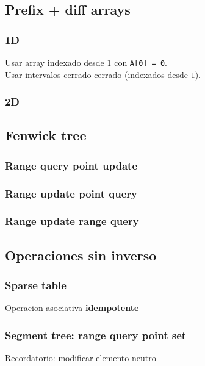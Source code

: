 \subsection{Prefix + diff arrays}
    \subsubsection{1D}
        Usar array indexado desde $1$ con \texttt{A[0] = 0}. \\
        Usar intervalos cerrado-cerrado (indexados desde $1$).
    \subsubsection{2D}
\subsection{Fenwick tree}
    \subsubsection{Range query point update}
    \subsubsection{Range update point query}
    \subsubsection{Range update range query}
\subsection{Operaciones sin inverso}
    \subsubsection{Sparse table}
        Operacion asociativa \textbf{idempotente}
    \subsubsection{Segment tree: range query point set}
        Recordatorio: modificar elemento neutro
       
